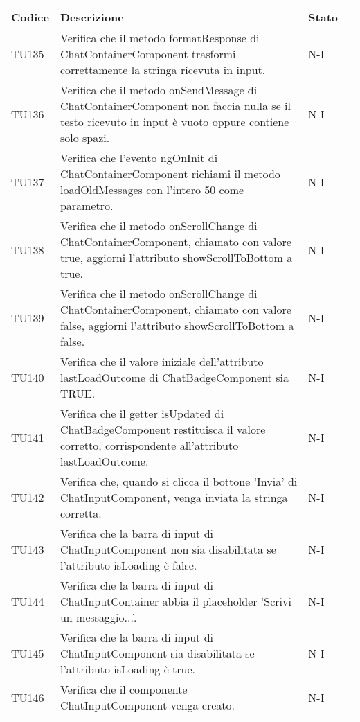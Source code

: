 \begin{table}[h!]
    \centering
    \renewcommand{\arraystretch}{1.5}
    \begin{tabularx}{\textwidth}{|p{}|X|p{}|p{}|}\hline
    \rowcolor[HTML]{FFD700}
    \textbf{Codice} & \textbf{Descrizione} & \textbf{Stato} \\ \hline

    TU135 & Verifica che il metodo formatResponse di ChatContainerComponent trasformi correttamente la stringa ricevuta in input. &  N-I \\ \hline
    TU136 & Verifica che il metodo onSendMessage di ChatContainerComponent non faccia nulla se il testo ricevuto in input è vuoto oppure contiene solo spazi. &  N-I \\ \hline
    TU137 & Verifica che l'evento ngOnInit di ChatContainerComponent richiami il metodo loadOldMessages con l'intero 50 come parametro. &  N-I \\ \hline
    TU138 & Verifica che il metodo onScrollChange di ChatContainerComponent, chiamato con valore true, aggiorni l'attributo showScrollToBottom a true. &  N-I \\ \hline
    TU139 & Verifica che il metodo onScrollChange di ChatContainerComponent, chiamato con valore false, aggiorni l'attributo showScrollToBottom a false. &  N-I \\ \hline
    TU140 & Verifica che il valore iniziale dell'attributo lastLoadOutcome di ChatBadgeComponent sia TRUE. &  N-I \\ \hline
    TU141 & Verifica che il getter isUpdated di ChatBadgeComponent restituisca il valore corretto, corrispondente all'attributo lastLoadOutcome. &  N-I \\ \hline
    TU142 & Verifica che, quando si clicca il bottone 'Invia' di ChatInputComponent, venga inviata la stringa corretta. &  N-I \\ \hline
    TU143 & Verifica che la barra di input di ChatInputComponent non sia disabilitata se l'attributo isLoading è false. &  N-I \\ \hline
    TU144 & Verifica che la barra di input di ChatInputContainer abbia il placeholder 'Scrivi un messaggio...'. &  N-I \\ \hline
    TU145 & Verifica che la barra di input di ChatInputComponent sia disabilitata se l'attributo isLoading è true. &  N-I \\ \hline
    TU146 & Verifica che il componente ChatInputComponent venga creato. &  N-I \\ \hline

\end{tabularx}
\end{table}
